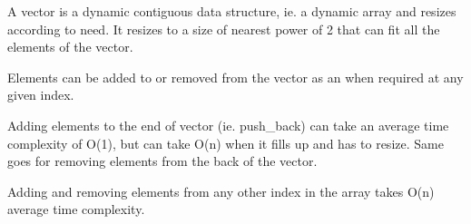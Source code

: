 A vector is a dynamic contiguous data structure, ie. a dynamic array and resizes according to need. It resizes to a size of nearest power of 2 that can fit all the elements of the vector.

Elements can be added to or removed from the vector as an when required at any given index.

Adding elements to the end of vector (ie. push\+\_\+back) can take an average time complexity of O(1), but can take O(n) when it fills up and has to resize. Same goes for removing elements from the back of the vector.

Adding and removing elements from any other index in the array takes O(n) average time complexity. 